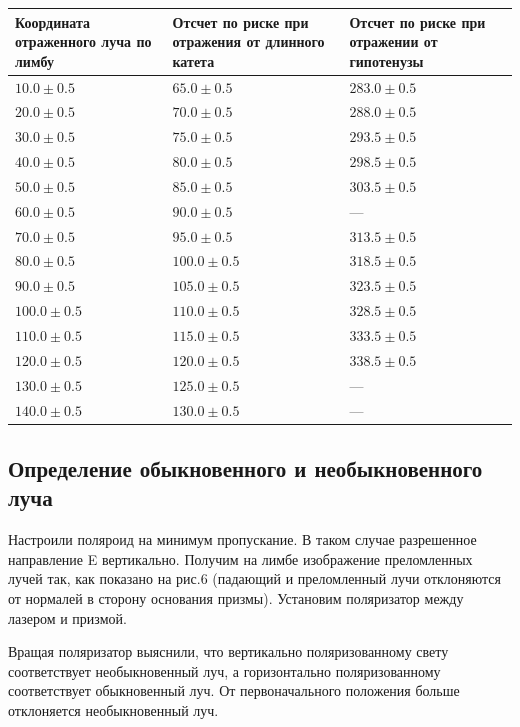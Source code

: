 \documentclass[a4paper]{article}
\begin{document}
\begin{tabular}{|>{\raggedright\arraybackslash}p{4.5cm}|>{\raggedright\arraybackslash}p{4.5cm}|>{\raggedright\arraybackslash}p{4.5cm}|}
\hline
\textbf{Координата отраженного луча по лимбу} & \textbf{Отсчет по риске при отражения от длинного катета } & \textbf{Отсчет по риске при отражении от гипотенузы} \\
\hline
$10.0 \pm 0.5$  & $65.0 \pm 0.5$ & $283.0 \pm 0.5$ \\
\hline
$20.0 \pm 0.5$ & $70.0 \pm 0.5$ & $288.0 \pm 0.5$ \\
\hline
$30.0 \pm 0.5$ & $75.0 \pm 0.5$ & $293.5 \pm 0.5$ \\
\hline
$40.0 \pm 0.5$ & $80.0 \pm 0.5$ & $298.5 \pm 0.5$ \\
\hline
$50.0 \pm 0.5$ & $85.0 \pm 0.5$ & $303.5 \pm 0.5$ \\
\hline
$60.0 \pm 0.5$ & $90.0 \pm 0.5$ & --- \\
\hline
$70.0 \pm 0.5$ & $95.0 \pm 0.5$ & $313.5 \pm 0.5$ \\
\hline
$80.0 \pm 0.5$ & $100.0 \pm 0.5$ & $318.5 \pm 0.5$ \\
\hline
$90.0 \pm 0.5$ & $105.0 \pm 0.5$ & $323.5 \pm 0.5$ \\
\hline
$100.0 \pm 0.5$ & $110.0 \pm 0.5$ & $328.5 \pm 0.5$ \\
\hline
$110.0 \pm 0.5$ & $115.0 \pm 0.5$ & $333.5 \pm 0.5$ \\
\hline
$120.0 \pm 0.5$ & $120.0 \pm 0.5$ & $338.5 \pm 0.5$ \\
\hline
$130.0 \pm 0.5$ & $125.0 \pm 0.5$ & --- \\
\hline
$140.0 \pm 0.5$ & $130.0 \pm 0.5$ & --- \\
\hline
\end{tabular}

\subsection{Определение обыкновенного и необыкновенного луча}

Настроили поляроид на минимум пропускание. В таком случае разрешенное направление E вертикально.
Получим на лимбе изображение преломленных лучей так, как показано на рис.6 (падающий и преломленный лучи отклоняются от нормалей в сторону основания призмы).
Установим поляризатор между лазером и призмой.\par 
Вращая поляризатор выяснили, что вертикально поляризованному свету соответствует необыкновенный луч, а горизонтально поляризованному соответствует обыкновенный луч. 
От первоначального положения больше отклоняется необыкновенный луч.
\end{document}
